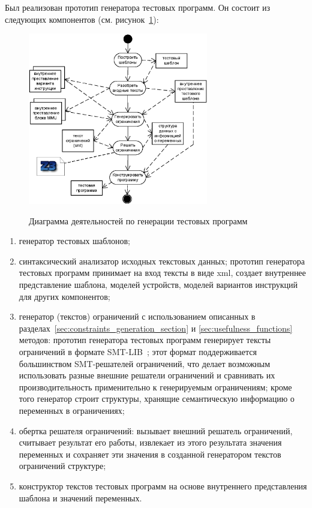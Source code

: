 Был реализован прототип генератора тестовых программ. Он состоит из следующих компонентов (см. рисунок~\ref{fig:activities}):
\begin{figure}[h] \center
  \includegraphics[width=0.7\textwidth]{3.impl/activities1}\\
  \caption{Диаграмма деятельностей по генерации тестовых программ}\label{fig:activities}
\end{figure}
\begin{enumerate}
  \item генератор тестовых шаблонов;
  \item синтаксический анализатор исходных текстовых данных; прототип генератора тестовых программ принимает на вход тексты в виде xml, создает внутреннее представление шаблона, моделей устройств, моделей вариантов инструкций для других компонентов;
  \item генератор (текстов) ограничений с использованием описанных в разделах~\ref{sec:constraints_generation_section} и \ref{sec:usefulness_functions} методов: прототип генератора тестовых программ генерирует тексты ограничений в формате SMT-LIB~\cite{SMT}; этот формат поддерживается большинством SMT-решателей ограничений, что делает возможным использовать разные внешние решатели ограничений и сравнивать их производительность применительно к генерируемым ограничениям; кроме того генератор строит структуры, хранящие семантическую информацию о переменных в ограничениях;
  \item обертка решателя ограничений: вызывает внешний решатель ограничений, считывает результат его работы, извлекает из этого результата значения переменных и сохраняет эти значения в созданной генератором текстов ограничений структуре;
  \item конструктор текстов тестовых программ на основе внутреннего представления шаблона и значений переменных.
\end{enumerate}

